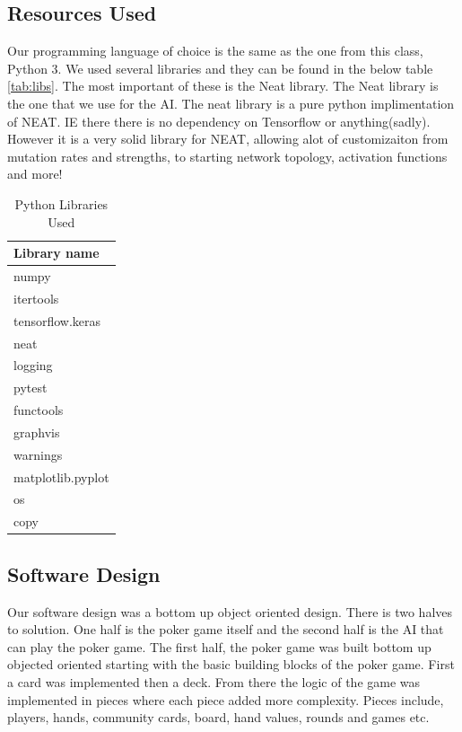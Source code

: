 \subsection{Resources Used}
Our programming language of choice is the same as the one from this class, Python 3. We used several libraries
and they can be found in the below table \autoref{tab:libs}. The most important of these is the Neat library.
The Neat library is the one that we use for the AI. The neat library is a pure python implimentation of NEAT.
IE there there is no dependency on Tensorflow or anything(sadly). However it is a very solid library for NEAT,
allowing alot of customizaiton from mutation rates and strengths, to starting network topology, activation
functions and more!

\begin{table}[H]
    \caption{Python Libraries Used}
    \centering
    \begin{tabular}{ | l |}
    \hline
        Library name \\
        \hline
        \hline
        numpy \\
        itertools \\
        tensorflow.keras \\
        neat \\
        logging \\
        pytest \\
        functools \\
        graphvis \\
        warnings \\
        matplotlib.pyplot \\
        os \\
        copy \\
        
    \hline
    \end{tabular}
    \label{tab:libs}
\end{table}

\subsection{Software Design}
Our software design was a bottom up object oriented design. There is two halves to solution. One half is the poker game itself and the second half is the AI that can play the poker game. The first half, the poker game was built bottom up objected oriented starting with the basic building blocks of the poker game. First a card was implemented then a deck. From there the logic of the game was implemented in pieces where each piece added more complexity. Pieces include, players, hands, community cards, board, hand values, rounds and games etc. 

